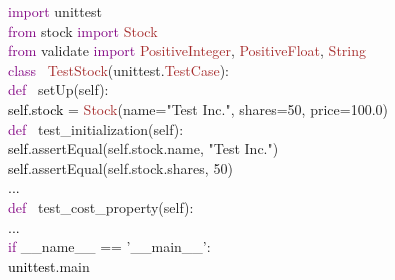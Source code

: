 
\begin{unittest}
\textcolor{purple}{import} unittest\\
\textcolor{purple}{from} stock \textcolor{purple}{import} \textcolor{brown}{Stock}\\
\textcolor{purple}{from} validate \textcolor{purple}{import} \textcolor{brown}{PositiveInteger}, \textcolor{brown}{PositiveFloat}, \textcolor{brown}{String}\\

\textcolor{purple}{class\ } \textcolor{brown}{TestStock}(unittest.\textcolor{brown}{TestCase}): \\
    \textcolor{purple}{\quad def\ } setUp(self): \\
        \textcolor{black}{\qquad self.stock} = \textcolor{brown}{Stock}(name="Test Inc.", shares=50, price=100.0) \\

    \textcolor{purple}{\quad def\ } test\_initialization(self):\\
        \textcolor{black}{\qquad self}.assertEqual(self.stock.name, "Test Inc.") \\
        \textcolor{black}{\qquad self}.assertEqual(self.stock.shares, 50)\\
        \textcolor{black}{\qquad ...} \\

    \textcolor{purple}{\quad def\ } test\_cost\_property(self): \\
    \textcolor{black}{\qquad ...} \\

\textcolor{purple}{if} \_\_name\_\_ == '\_\_main\_\_': \\
    \textcolor{black}{\quad unittest}.main\(\)
\end{unittest}
